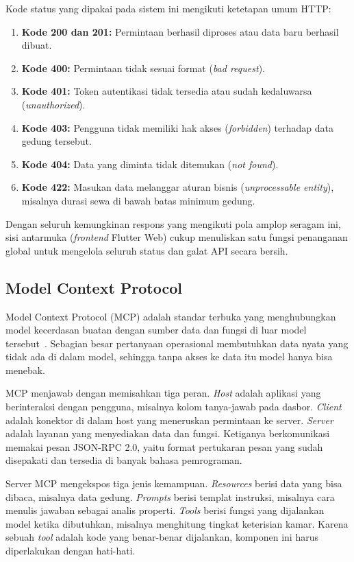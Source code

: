 Kode status yang dipakai pada sistem ini mengikuti ketetapan umum HTTP:
\begin{enumerate}[label=\arabic*., leftmargin=*]
  \item \textbf{Kode 200 dan 201:} Permintaan berhasil diproses atau data baru berhasil dibuat.
  \item \textbf{Kode 400:} Permintaan tidak sesuai format (\textit{bad request}).
  \item \textbf{Kode 401:} Token autentikasi tidak tersedia atau sudah kedaluwarsa (\textit{unauthorized}).
  \item \textbf{Kode 403:} Pengguna tidak memiliki hak akses (\textit{forbidden}) terhadap data gedung tersebut.
  \item \textbf{Kode 404:} Data yang diminta tidak ditemukan (\textit{not found}).
  \item \textbf{Kode 422:} Masukan data melanggar aturan bisnis (\textit{unprocessable entity}), misalnya durasi sewa di bawah batas minimum gedung.
\end{enumerate}

Dengan seluruh kemungkinan respons yang mengikuti pola amplop seragam ini, sisi antarmuka (\textit{frontend} Flutter Web) cukup menuliskan satu fungsi penanganan global untuk mengelola seluruh status dan galat API secara bersih.

\subsection{Model Context Protocol}

Model Context Protocol (MCP) adalah standar terbuka yang menghubungkan model kecerdasan buatan dengan sumber data dan fungsi di luar model tersebut~\cite{anthropic2024}. Sebagian besar pertanyaan operasional membutuhkan data nyata yang tidak ada di dalam model, sehingga tanpa akses ke data itu model hanya bisa menebak.

MCP menjawab dengan memisahkan tiga peran. \textit{Host} adalah aplikasi yang berinteraksi dengan pengguna, misalnya kolom tanya-jawab pada dasbor. \textit{Client} adalah konektor di dalam host yang meneruskan permintaan ke server. \textit{Server} adalah layanan yang menyediakan data dan fungsi. Ketiganya berkomunikasi memakai pesan JSON-RPC 2.0, yaitu format pertukaran pesan yang sudah disepakati dan tersedia di banyak bahasa pemrograman.

Server MCP mengekspos tiga jenis kemampuan. \textit{Resources} berisi data yang bisa dibaca, misalnya data gedung. \textit{Prompts} berisi templat instruksi, misalnya cara menulis jawaban sebagai analis properti. \textit{Tools} berisi fungsi yang dijalankan model ketika dibutuhkan, misalnya menghitung tingkat keterisian kamar. Karena sebuah \textit{tool} adalah kode yang benar-benar dijalankan, komponen ini harus diperlakukan dengan hati-hati.

